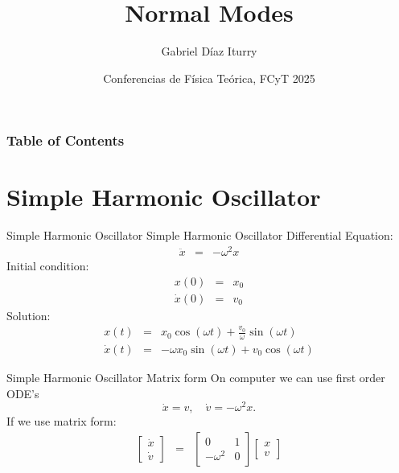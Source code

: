 \documentclass[aspectratio=169]{beamer}
\title{Normal Modes}
\author{Gabriel D\'iaz Iturry}
\date{Conferencias de F\'isica Te\'orica, FCyT 2025}
\begin{document}
\maketitle

\begin{frame}
\frametitle{Table of Contents}
\tableofcontents
\end{frame}

\section{Simple Harmonic Oscillator}

\begin{frame}{Simple Harmonic Oscillator}
    Simple Harmonic Oscillator Differential Equation:
    \begin{eqnarray}
        \ddot x & = &  -\omega^2 x 
    \end{eqnarray}
    \pause
    Initial condition:
    \begin{eqnarray}
        x(0) & = & x_0 \nonumber \\
        \dot x(0) & = & v_0 \nonumber
    \end{eqnarray}
    \pause
    Solution:
    \begin{eqnarray}
        x(t) & = & x_0\cos(\omega t) + \frac{v_0}{\omega}\sin(\omega t) \nonumber \\
        \dot x(t) & = & -\omega x_0\sin(\omega t) + v_0\cos(\omega t) \nonumber
    \end{eqnarray}
\end{frame}

\begin{frame}{Simple Harmonic Oscillator Matrix form}
    On computer we can use first order ODE's
    \[
        \dot x  =  v, \quad
        \dot v  = -\omega^2 x.
    \]
    \pause
    If we use matrix form:
    \begin{eqnarray}
        \begin{bmatrix} \dot x \\ \dot v \end{bmatrix} & = & \begin{bmatrix} 0 & 1 \\ -\omega^2 & 0 \end{bmatrix}  \begin{bmatrix} x \\ v \end{bmatrix} \nonumber
    \end{eqnarray}
\end{frame}
\end{document}
